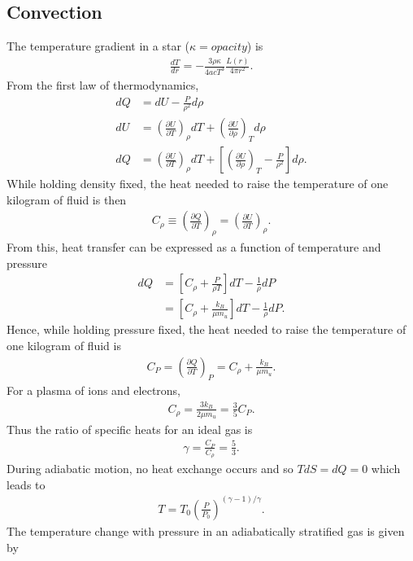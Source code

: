 \begin{multicols}{2}
\section{Convection}
The temperature gradient in a star ($\kappa= opacity$) is
\begin{align}
\frac{dT}{dr} = -\frac{3\rho\kappa}{4acT^3}\frac{L(r)}{4\pi r^2}.
\end{align}
From the first law of thermodynamics,
\begin{align}
dQ &= dU - \frac{P}{\rho^2}d\rho \\
dU &=  \left(\frac{\partial U}{\partial T}\right)_\rho dT +\left(\frac{\partial U}{\partial \rho}\right)_T d\rho \\
dQ &= \left(\frac{\partial U}{\partial T}\right)_\rho dT +\left[\left(\frac{\partial U}{\partial \rho}\right)_T- \frac{P}{\rho^2}\right] d\rho.
\end{align}
While holding density fixed, the heat needed to raise the temperature of one kilogram of fluid is then
\begin{align}
C_\rho \equiv \left(\frac{\partial Q}{\partial T}\right)_\rho = \left(\frac{\partial U}{\partial T}\right)_\rho.
\end{align}
From this, heat transfer can be expressed as a function of temperature and pressure
\begin{align}
dQ &= \left[C_\rho+\frac{P}{\rho T}\right]dT - \frac{1}{\rho}dP \\
&= \left[C_\rho+\frac{k_B}{\mu m_u}\right]dT - \frac{1}{\rho}dP.
\end{align}
Hence, while holding pressure fixed, the heat needed to raise the temperature of one kilogram of fluid is
\begin{align}
C_P = \left(\frac{\partial Q}{\partial T}\right)_P = C_\rho + \frac{k_B}{\mu m_u}.
\end{align}
For a plasma of ions and electrons,
\begin{align}
C_\rho =\frac{3k_B}{2\mu m_u} = \frac{3}{5} C_P.
\end{align}
Thus the ratio of specific heats for an ideal gas is
\begin{align}
\gamma = \frac{C_P}{C_\rho} = \frac{5}{3}.
\end{align}
During adiabatic motion, no heat exchange occurs and so $TdS = dQ =0$ which leads to
\begin{align}
T=T_0\left(\frac{P}{P_0}\right)^{(\gamma -1)/\gamma}.
\end{align}
The temperature change with pressure in an adiabatically stratified gas is given by

\end{multicols}
